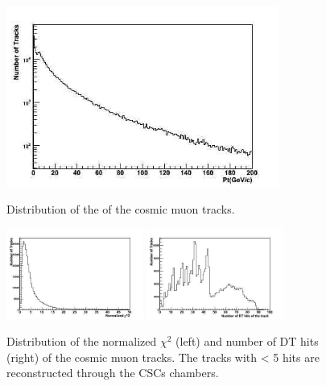 \begin{figure}[hbtp]

     \begin{minipage}{1.0\textwidth}
     \begin{center}
      \includegraphics[width=0.8\textwidth]{pt_sta}
       \caption{ 
Distribution of the \pt of the cosmic muon tracks. 
}
      \label{fig:pttrack}
  \end{center}
  \end{minipage}
     
 \begin{minipage}{1.0\textwidth}
  \begin{center}
 
     \includegraphics[width=0.4\textwidth]{chi2_sta}
     \includegraphics[width=0.4\textwidth]{num_hits_sta}
\caption{Distribution of the normalized $\chi^2$ (left) and number of DT hits (right) 
of the cosmic muon tracks. The tracks with < 5 hits
 are reconstructed through the CSCs chambers. }
      \label{fig:nhitschi2}
  \end{center}
  \end{minipage}

\end{figure}

